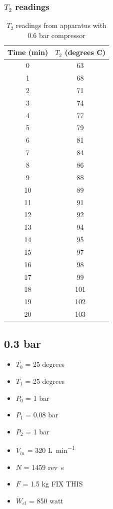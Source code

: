 \documentclass[class=article, crop=false, 12pt,a4paper]{standalone}
\begin{document}
\subsubsection{\(T_2\) readings}
\begin{table}
  \centering
    \begin{tabular}{|c|c|}
      \hline
      Time (\si{\minute}) & \(T_2\) (degrees C)\\
      \hline  
      0 & 63\\
      1 & 68\\
      2 & 71\\
      3 & 74\\
      4 & 77\\
      5 & 79\\
      6 & 81\\
      7 & 84\\
      8 & 86\\
      9 & 88\\
      10 & 89\\
      11 & 91\\
      12 & 92\\
      13 & 94\\
      14 & 95\\
      15 & 97\\
      16 & 98\\
      17 & 99\\
      18 & 101\\
      19 & 102\\
      20 & 103\\
      \hline
    \end{tabular}
  \caption{\(T_2\) readings from apparatus with 0.6 bar compressor}
  \label{table:2}
\end{table}
\subsection{0.3 bar}
\begin{multicols}{2}
  \begin{itemize}[noitemsep]
    \item \(T_0\) = 25 degrees
    \item \(T_1\) = 25 degrees
    \item \(P_0\) = 1 \si{\bar}
    \item \(P_1\) = 0.08 \si{\bar}
    \item \(P_2\) = 1 \si{\bar}
    \item \(V_{in}\) = 320 \si{\liter\per\minute}
    \item \(N\) = 1459 rev\si{\per\second}
    \item \(F\) = 1.5 \si{\kilogram} FIX THIS
    \item \(\dot{W}_{el}\) = 850 \si{watt}
  \end{itemize}
\end{multicols}
\end{document}

